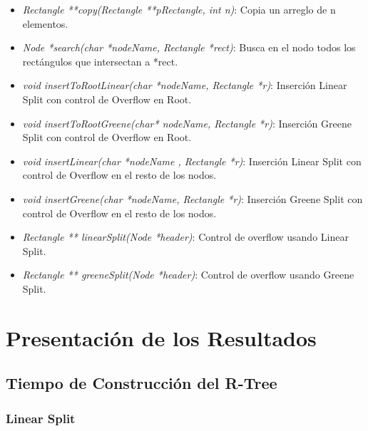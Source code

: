 \documentclass[letterpaper,10pt]{article}
\begin{document}
\begin{itemize}
		\item \textit{Rectangle **copy(Rectangle **pRectangle, int n)}: Copia un arreglo de n elementos.
		\item \textit{Node *search(char *nodeName, Rectangle *rect)}: Busca en el nodo todos los rectángulos que intersectan a *rect.
		\item \textit{void insertToRootLinear(char *nodeName, Rectangle *r)}: Inserción Linear Split con control de Overflow en Root.
		\item \textit{void insertToRootGreene(char* nodeName, Rectangle *r)}: Inserción Greene Split con control de Overflow en Root.
		\item \textit{void insertLinear(char *nodeName , Rectangle *r)}: Inserción Linear Split con control de Overflow en el resto de los nodos.
		\item \textit{void insertGreene(char *nodeName, Rectangle *r)}: Inserción Greene Split con control de Overflow en el resto de los nodos.
		\item \textit{Rectangle ** linearSplit(Node *header)}: Control de overflow usando Linear Split.
		\item \textit{Rectangle ** greeneSplit(Node *header)}: Control de overflow usando Greene Split.
	\end{itemize}

	\newpage

	\section{Presentación de los Resultados}

	\subsection{Tiempo de Construcción del R-Tree}
	\subsubsection{Linear Split}
\end{document}
